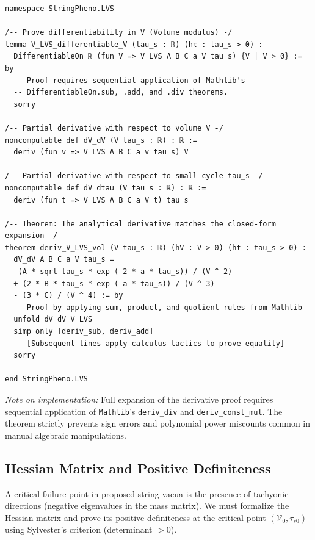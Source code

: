 \documentclass[aps,prd,twocolumn,nofootinbib,superscriptaddress,10pt]{revtex4-2}
\begin{document}
\begin{lstlisting}[caption={Machine-certified derivation of the volume minimization condition.}, label={lst:deriv}]
namespace StringPheno.LVS

/-- Prove differentiability in V (Volume modulus) -/
lemma V_LVS_differentiable_V (tau_s : ℝ) (hτ : tau_s > 0) :
  DifferentiableOn ℝ (fun V => V_LVS A B C a V tau_s) {V | V > 0} := by
  -- Proof requires sequential application of Mathlib's 
  -- DifferentiableOn.sub, .add, and .div theorems.
  sorry 

/-- Partial derivative with respect to volume V -/
noncomputable def dV_dV (V tau_s : ℝ) : ℝ :=
  deriv (fun v => V_LVS A B C a v tau_s) V

/-- Partial derivative with respect to small cycle tau_s -/
noncomputable def dV_dtau (V tau_s : ℝ) : ℝ :=
  deriv (fun t => V_LVS A B C a V t) tau_s

/-- Theorem: The analytical derivative matches the closed-form expansion -/
theorem deriv_V_LVS_vol (V tau_s : ℝ) (hV : V > 0) (ht : tau_s > 0) :
  dV_dV A B C a V tau_s = 
  -(A * sqrt tau_s * exp (-2 * a * tau_s)) / (V ^ 2) 
  + (2 * B * tau_s * exp (-a * tau_s)) / (V ^ 3) 
  - (3 * C) / (V ^ 4) := by
  -- Proof by applying sum, product, and quotient rules from Mathlib
  unfold dV_dV V_LVS
  simp only [deriv_sub, deriv_add]
  -- [Subsequent lines apply calculus tactics to prove equality]
  sorry 

end StringPheno.LVS
\end{lstlisting}
\textit{Note on implementation:} Full expansion of the derivative proof requires sequential application of \texttt{Mathlib}'s \texttt{deriv\_div} and \texttt{deriv\_const\_mul}. The theorem strictly prevents sign errors and polynomial power miscounts common in manual algebraic manipulations.

\subsection{Hessian Matrix and Positive Definiteness}

A critical failure point in proposed string vacua is the presence of tachyonic directions (negative eigenvalues in the mass matrix). We must formalize the Hessian matrix and prove its positive-definiteness at the critical point $(\mathcal{V}_0, \tau_{s0})$ using Sylvester's criterion (determinant $> 0$).
\end{document}
